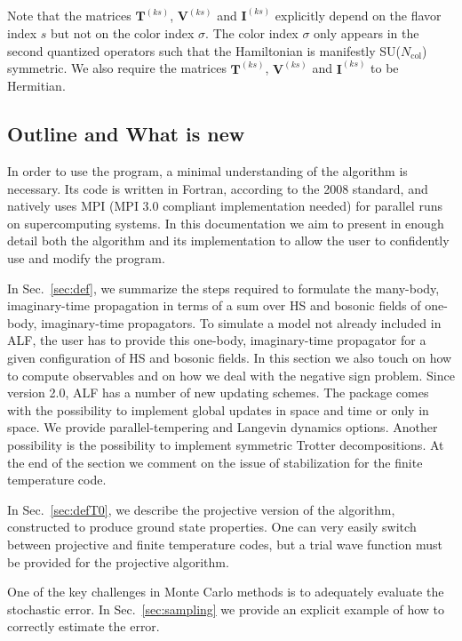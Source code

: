 Note that the matrices  $\bm{T}^{(ks)}$,  $\bm{V}^{(ks)}$ and  $\bm{I}^{(ks)}$ explicitly depend on the flavor index $s$ but not on the color index $\sigma$. 
The color index $\sigma$ only appears in  the  second quantized operators such that the Hamiltonian is manifestly SU($N_{\mathrm{col}}$)  symmetric.  We also require
the matrices $\bm{T}^{(ks)}$,  $\bm{V}^{(ks)}$ and  $\bm{I}^{(ks)}$  to be  Hermitian. 

\subsection{Outline and What is new}


In order to use the program, a minimal understanding of the algorithm is necessary. 
Its code is written in Fortran, according to the 2008 standard, and natively uses MPI (MPI 3.0 compliant implementation needed) for parallel runs on supercomputing systems.
In this documentation we aim to present in enough detail both the algorithm and its implementation to allow the user to confidently use and modify the program.

In Sec.~\ref{sec:def}, we summarize the steps required to formulate the many-body, imaginary-time propagation in terms of a sum over HS and bosonic fields of one-body, imaginary-time propagators.   
To simulate a model not already included in ALF, the user has to provide this one-body, imaginary-time propagator for a given configuration of HS and bosonic fields.  In this section we also touch on how to compute observables and on  how we deal with the negative sign problem.  Since version 2.0, ALF has a number of new updating schemes.   The package comes with  the possibility to  implement global updates in space and time or only in space. We provide parallel-tempering  and Langevin dynamics options.  Another possibility is the possibility to implement symmetric Trotter decompositions. At the end of the section we comment on the issue of stabilization for the finite temperature code. 

In Sec.~\ref{sec:defT0}, we describe the projective version of the algorithm, constructed to produce ground state properties. One can very easily switch between projective and finite temperature codes, but a trial wave function must be provided for the projective algorithm. 

One of the key challenges in  Monte Carlo methods is to  adequately evaluate the stochastic error.  In Sec.~\ref{sec:sampling}  we provide an explicit example  of how to correctly estimate the   error. 

